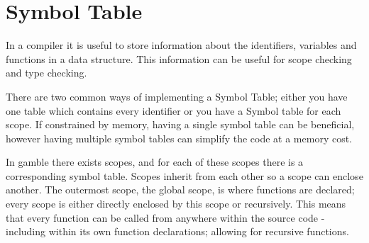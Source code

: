 \section{Symbol Table}
In a compiler it is useful to store information about the identifiers, variables and functions in a data structure. 
This information can be useful for scope checking and type checking.

There are two common ways of implementing a Symbol Table; either you have one table which contains every identifier or you have a Symbol table for each scope. 
If constrained by memory, having a single symbol table can be beneficial, however having multiple symbol tables can simplify the code at a memory cost. 

In \gls{gamble} there exists scopes, and for each of these scopes there is a corresponding symbol table. 
Scopes inherit from each other so a scope can enclose another. 
The outermost scope, the global scope, is where functions are declared; every scope is either directly enclosed by this scope or recursively.
This means that every function can be called from anywhere within the source code - including within its own function declarations; allowing for recursive functions.

